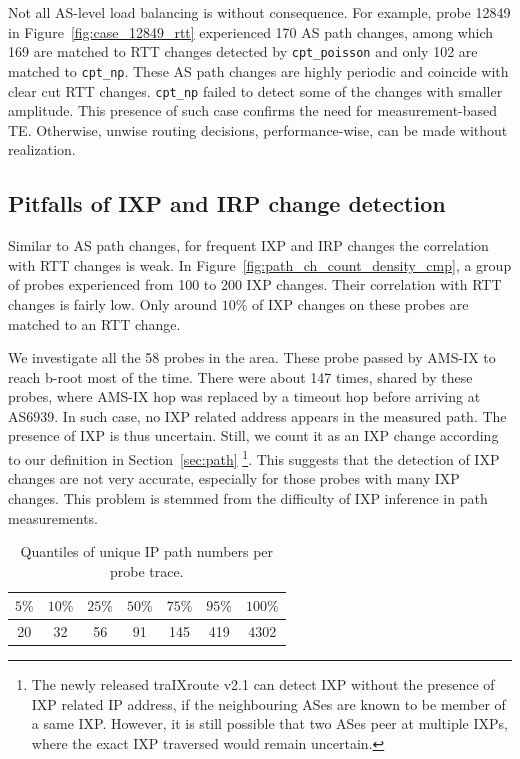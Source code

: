 Not all AS-level load balancing is without consequence. For example, probe 12849 in Figure~\ref{fig:case_12849_rtt} experienced 170 AS path changes, among which 169 are matched to RTT changes detected by \texttt{cpt\_poisson} and only 102 are matched to \texttt{cpt\_np}.
These AS path changes are highly periodic and coincide with clear cut RTT changes.
\texttt{cpt\_np} failed to detect some of the changes with smaller amplitude.
This presence of such case confirms the need for measurement-based TE.
Otherwise, unwise routing decisions, performance-wise, can be made without realization.

\subsection{Pitfalls of IXP and IRP change detection}
Similar to AS path changes, for frequent IXP and IRP changes the correlation with RTT changes is weak.
In Figure~\ref{fig:path_ch_count_density_cmp}, a group of probes experienced from 100 to 200 IXP changes. 
Their correlation with RTT changes is fairly low.
Only around $10\%$ of IXP changes on these probes are matched to an RTT change.

We investigate all the 58 probes in the area. These probe passed by AMS-IX to reach b-root most of the time. There were about 147 times, shared by these probes, where AMS-IX hop was replaced by a timeout hop before arriving at AS6939.
In such case, no IXP related address appears in the measured path. The presence of IXP is thus uncertain.
Still, we count it as an IXP change according to our definition in Section~\ref{sec:path}
\footnote{The newly released traIXroute v2.1 can detect IXP without the presence of IXP related IP address, if the neighbouring ASes are known to be member of a same IXP. However, it is still possible that two ASes peer at multiple IXPs, where the exact IXP traversed would remain uncertain.}.
This suggests that the detection of IXP changes are not very accurate, especially for those probes with many IXP changes.
This problem is stemmed from the difficulty of IXP inference in path measurements.


\begin{table}[!htb]
\caption{Quantiles of unique IP path numbers per probe trace.}
\label{tab:ip_path_count}
\centering
\footnotesize
\setlength{\tabcolsep}{0.5em}
\begin{tabular}{ccccccc}
\toprule
$5\%$ & $10\%$ & $25\%$ & $50\%$ & $75\%$ & $95\%$ & $100\%$\\
\midrule
20 & 32 & 56 & 91 & 145 & 419 & 4302\\
\bottomrule
\end{tabular}
\end{table}

